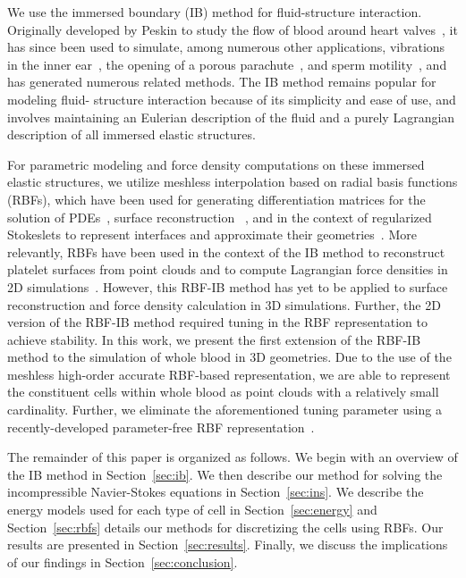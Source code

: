 We use the immersed boundary (IB) method for fluid-structure interaction. Originally developed by Peskin to study the flow of blood around heart valves~\cite{Peskin:1972wa},
it has since been used to simulate, among numerous other applications, vibrations in the
inner ear~\cite{BeyerJr:1990tb}, the opening of a porous parachute~\cite{Kim:2006ku}, and
sperm motility~\cite{Dillon:2011cu}, and has generated numerous related methods. The IB method remains popular for modeling fluid-%
structure interaction because of its simplicity and ease of use, and involves maintaining an Eulerian description of the fluid
and a purely Lagrangian description of all immersed elastic structures.

For parametric modeling and force density computations on these immersed elastic structures, we utilize meshless interpolation
based on radial basis functions (RBFs), which have been used for generating differentiation matrices
for the solution of PDEs~\cite{Fasshauer:2007ui}, surface reconstruction~%
\cite{Hardy:1971tb,Carr:2001tb, Shankar:2013ki,SFKSISC2018}, and in the context of regularized Stokeslets to
represent interfaces and approximate their geometries~\cite{Olson:2015ja}. More relevantly, RBFs have been used
in the context of the IB method to reconstruct platelet surfaces from point clouds and to compute Lagrangian force densities in 2D simulations~\cite{Shankar:2015km}. However,
this RBF-IB method has yet to be applied to surface reconstruction and force density calculation in 3D simulations. Further, the 2D version of the RBF-IB method required
tuning in the RBF representation to achieve stability. In this work, we present the first extension of the RBF-IB method to the simulation of whole blood in 3D geometries.  Due to the use of the meshless high-order accurate RBF-based representation, we are able to represent the constituent cells within whole blood as point clouds with a relatively
small cardinality. Further, we eliminate the aforementioned tuning parameter using a recently-developed parameter-free RBF representation~\cite{SFKSISC2018}.

The remainder of this paper is organized as follows. We begin with an overview of the IB method in Section~\ref{sec:ib}. We then describe our method
for solving the incompressible Navier-Stokes equations in Section~\ref{sec:ins}. We
describe the energy models used for each type of cell in Section~\ref{sec:energy} and
Section~\ref{sec:rbfs} details our methods for discretizing the cells using RBFs. Our
results are presented in Section~\ref{sec:results}.  Finally, we discuss the implications
of our findings in Section~\ref{sec:conclusion}.

